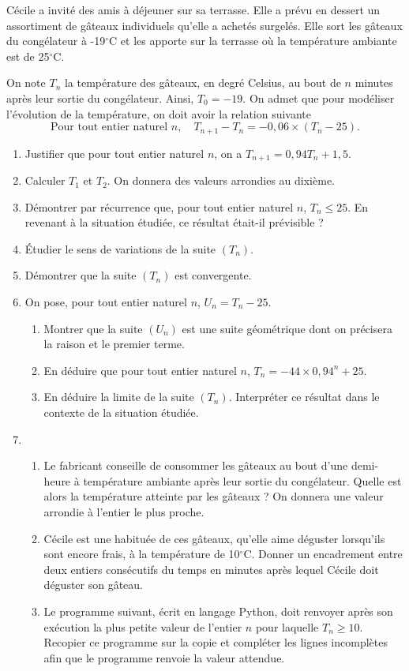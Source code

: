 \documentclass[11pt,fleqn, openany]{book} %
\begin{document}
\begin{exercise}[subtitle={(Métropole 2021)}]
Cécile a invité des amis à déjeuner sur sa terrasse. Elle a prévu en dessert un assortiment de gâteaux individuels qu'elle a achetés surgelés. Elle sort les gâteaux du congélateur à -19$^{\circ}$C et les apporte sur la terrasse où la température 
ambiante est de 25$^{\circ}$C. 

On note $T_n$ la température des gâteaux, en degré Celsius, au bout de $n$ minutes après leur sortie du congélateur. Ainsi, $T_0=-19$. On admet que pour modéliser l'évolution de la température, on doit avoir la relation suivante
\[ \text{Pour tout entier naturel }n,\quad T_{n+1} - T_n = -0,06 \times (T_n - 25).\]
\begin{enumerate}
\item Justifier que pour tout entier naturel $n$, on a $T_{n+1}=0,94T_n+1,5$.
\item Calculer $T_1$ et $T_2$. On donnera des valeurs arrondies au dixième.
\item Démontrer par récurrence que, pour tout entier naturel $n$, $T_n \leqslant 25$. En revenant à la situation étudiée, ce résultat était-il prévisible ?
\item Étudier le sens de variations de la suite $(T_n)$.
\item Démontrer que la suite $(T_n)$ est convergente.
\item On pose, pour tout entier naturel $n$, $U_n=T_n-25$.
\begin{enumerate}
\item Montrer que la suite $(U_n)$ est une suite géométrique dont on précisera la raison et le premier terme.
\item En déduire que pour tout entier naturel $n$, $T_n=-44\times 0,94^n+25$.
\item En déduire la limite de la suite $(T_n)$. Interpréter ce résultat dans le contexte de la situation étudiée.
\end{enumerate}
\item \begin{enumerate}
\item Le fabricant conseille de consommer les gâteaux au bout d'une demi-heure à 
température ambiante après leur sortie du congélateur. Quelle est alors la 
température atteinte par les gâteaux ? On donnera une valeur arrondie à l'entier le 
plus proche.
\item  Cécile est une habituée de ces gâteaux, qu'elle aime déguster lorsqu'ils sont encore frais, à la température de 10$^{\circ}$C. Donner un encadrement entre deux entiers  consécutifs du temps en minutes après lequel Cécile doit déguster son gâteau. 
\item Le programme suivant, écrit en langage Python, doit renvoyer après son exécution la plus petite valeur de l'entier $n$ pour laquelle $T_n\geqslant 10$. Recopier ce programme sur la copie et compléter les lignes incomplètes  afin que le programme renvoie la  valeur attendue.



\end{enumerate}
\end{enumerate}
\end{exercise}
\end{document}
